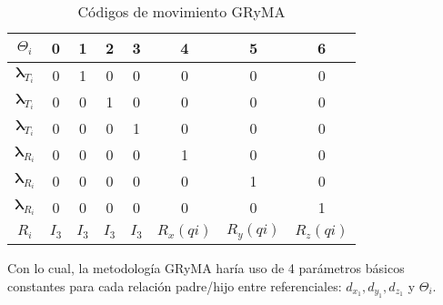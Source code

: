         \begin{table}[H]
            \caption{Códigos de movimiento GRyMA}
            \centering
                \begin{center}
                    \begin{tabular}{cccccccc}
                        $\Theta_i$ & 0 & 1 & 2 & 3 & 4 & 5 & 6\\
                        \hline \hline 
                        $\boldsymbol{\lambda}_{T_i}$ & 0 & 1 & 0 & 0 & 0 & 0 & 0\\ 
                        $\boldsymbol{\lambda}_{T_i}$ & 0 & 0 & 1 & 0 & 0 & 0 & 0\\
                        $\boldsymbol{\lambda}_{T_i}$ & 0 & 0 & 0 & 1 & 0 & 0 & 0\\
                        \hline 
                        $\boldsymbol{\lambda}_{R_i}$ & 0 & 0 & 0 & 0 & 1 & 0 & 0\\
                        $\boldsymbol{\lambda}_{R_i}$ & 0 & 0 & 0 & 0 & 0 & 1 & 0\\
                        $\boldsymbol{\lambda}_{R_i}$ & 0 & 0 & 0 & 0 & 0 & 0 & 1\\
                        \hline 
                        $R_{i}$ & $I_3$ & $I_3$ & $I_3$ & $I_3$ & $R_{x}(qi)$ & $R_{y}(qi)$ & $R_{z}(qi)$\\
                    \end{tabular}
                \end{center}   
        \end{table}
        Con lo cual, la metodología GRyMA haría uso de 4 parámetros básicos constantes 
        para cada relación padre/hijo entre referenciales: $d_{x_1}, d_{y_1}, d_{z_1}$ 
        y $\Theta_i$.

